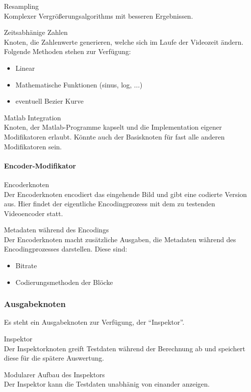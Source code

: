 \begin{speclist}[F]
\optspec Resampling \\
Komplexer Vergrößerungsalgorithms mit besseren Ergebnissen.

\optspec Zeitsabhänige Zahlen \\
Knoten, die Zahlenwerte generieren, welche sich im Laufe der Videozeit ändern. Folgende Methoden stehen zur Verfügung:
\begin{itemize}
	\item Linear
	\item Mathematische Funktionen (sinus, log, ...)
	\item eventuell Bezier Kurve
\end{itemize}

\optspec Matlab Integration \\
Knoten, der Matlab-Programme kapselt und die Implementation eigener Modifikatoren erlaubt. Könnte auch der Basisknoten für fast alle anderen Modifikatoren sein.

\end{speclist}

\paragraph{Encoder-Modifikator}

\begin{speclist}[F]

\spec Encoderknoten \\
Der Encoderknoten encodiert das eingehende Bild und gibt eine codierte Version aus. Hier findet der eigentliche Encodingprozess mit dem zu testenden Videoencoder statt.

\optspec Metadaten während des Encodings \\
Der Encoderknoten macht zusätzliche Ausgaben, die Metadaten während des Encodingprozesses darstellen. Diese sind:
\begin{itemize}
	\item Bitrate
	\item Codierungsmethoden der Blöcke
\end{itemize}

\end{speclist}

\subsubsection{Ausgabeknoten}
Es steht ein Ausgabeknoten zur Verfügung, der "`Inspektor"'.

\begin{speclist}[F]
\setcounter{specnum}{23010}

\spec Inspektor \\
Der Inspektorknoten greift Testdaten während der Berechnung ab und speichert diese für die spätere Auswertung.

\spec Modularer Aufbau des Inspektors \\
Der Inspektor kann die Testdaten unabhänig von einander anzeigen.

\end{speclist}

